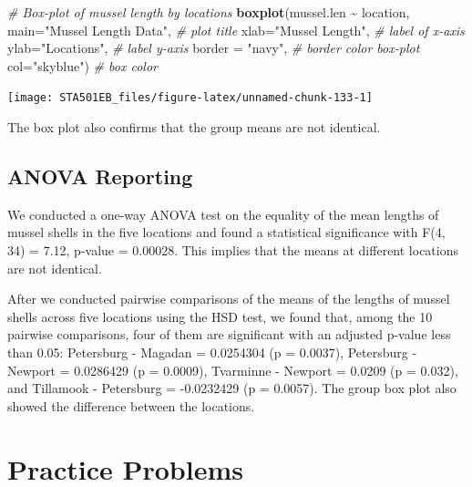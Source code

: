 \documentclass[
]{book}
\newenvironment{Shaded}{\begin{snugshade}}{\end{snugshade}}
\newcommand{\AttributeTok}[1]{\textcolor[rgb]{0.13,0.29,0.53}{#1}}
\newcommand{\CommentTok}[1]{\textcolor[rgb]{0.56,0.35,0.01}{\textit{#1}}}
\newcommand{\FunctionTok}[1]{\textcolor[rgb]{0.13,0.29,0.53}{\textbf{#1}}}
\newcommand{\NormalTok}[1]{#1}
\newcommand{\SpecialCharTok}[1]{\textcolor[rgb]{0.81,0.36,0.00}{\textbf{#1}}}
\newcommand{\StringTok}[1]{\textcolor[rgb]{0.31,0.60,0.02}{#1}}
\begin{document}
\begin{Shaded}
\begin{Highlighting}[]
\CommentTok{\# Box{-}plot of mussel length by locations}
\FunctionTok{boxplot}\NormalTok{(mussel.len }\SpecialCharTok{\textasciitilde{}}\NormalTok{ location,         }
        \AttributeTok{main=}\StringTok{"Mussel Length Data"}\NormalTok{, }\CommentTok{\# plot title}
        \AttributeTok{xlab=}\StringTok{"Mussel Length"}\NormalTok{,      }\CommentTok{\# label of x{-}axis}
        \AttributeTok{ylab=}\StringTok{"Locations"}\NormalTok{,          }\CommentTok{\# label y{-}axis}
        \AttributeTok{border =} \StringTok{"navy"}\NormalTok{,           }\CommentTok{\# border color box{-}plot}
        \AttributeTok{col=}\StringTok{"skyblue"}\NormalTok{)             }\CommentTok{\# box color}
\end{Highlighting}
\end{Shaded}

\begin{center}\texttt{[image: STA501EB\_files/figure-latex/unnamed-chunk-133-1]} \end{center}

The box plot also confirms that the group means are not identical.

\hypertarget{anova-reporting}{%
\subsection{ANOVA Reporting}\label{anova-reporting}}

We conducted a one-way ANOVA test on the equality of the mean lengths of mussel shells in the five locations and found a statistical significance with F(4, 34) = 7.12, p-value = 0.00028. This implies that the means at different locations are not identical.

After we conducted pairwise comparisons of the means of the lengths of mussel shells across five locations using the HSD test, we found that, among the 10 pairwise comparisons, four of them are significant with an adjusted p-value less than 0.05: Petersburg - Magadan = 0.0254304 (p = 0.0037), Petersburg - Newport = 0.0286429 (p = 0.0009), Tvarminne - Newport = 0.0209 (p = 0.032), and Tillamook - Petersburg = -0.0232429 (p = 0.0057). The group box plot also showed the difference between the locations.

\hfill\break

\hypertarget{practice-problems-1}{%
\section{Practice Problems}\label{practice-problems-1}}
\end{document}
